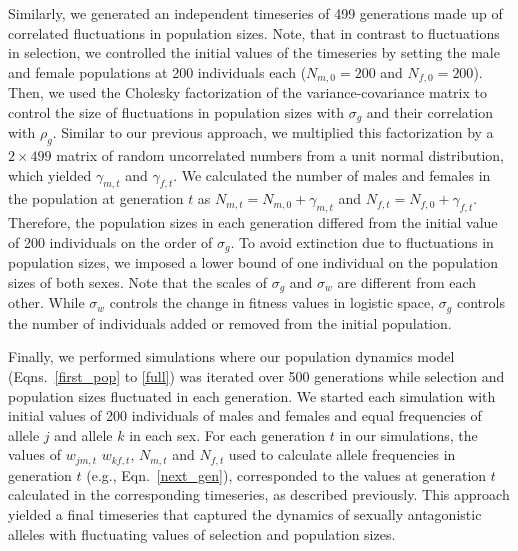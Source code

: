 \begin{refsection}
Similarly, we generated an independent timeseries of 499 generations made up of correlated fluctuations in population sizes. Note, that in contrast to fluctuations in selection, we controlled the initial values of the timeseries by setting the male and female populations at 200 individuals each ($N_{m,0} =200$ and $N_{f,0} =200$). Then, we used the Cholesky factorization of the variance-covariance matrix to control the size of fluctuations in population sizes with $\sigma_{g}$ and their correlation with $\rho_{g}$. Similar to our previous approach, we multiplied this factorization by a $2 \times 499$ matrix of random uncorrelated numbers from a unit normal distribution, which yielded $\gamma_{m,t}$ and $\gamma_{f,t}$. We calculated the number of males and females in the population at generation $t$ as $N_{m,t} = N_{m,0} + \gamma_{m,t}$ and $N_{f,t} = N_{f,0}+ \gamma_{f,t} $. Therefore, the population sizes in each generation differed from the initial value of 200 individuals on the order of $\sigma_{g}$. To avoid extinction due to fluctuations in population sizes, we imposed a lower bound of one individual on the population sizes of both sexes. Note that the scales of $\sigma_{g}$ and  $\sigma_{w}$ are different from each other. While $\sigma_{w}$ controls the change in fitness values in logistic space, $\sigma_{g}$ controls the number of individuals added or removed from the initial population.



Finally, we performed simulations where our population dynamics model (Eqns.~\ref{first_pop} to \ref{full}) was iterated over 500 generations while selection and population sizes fluctuated in each generation. We started each simulation with initial values of 200 individuals of males and females and equal frequencies of allele $j$ and allele $k$ in each sex. For each generation $t$ in our simulations, the values of $w_{jm,t}$ $w_{kf,t}$, $N_{m,t}$ and $N_{f,t}$ used to calculate allele frequencies in generation $t$ (e.g., Eqn.~\ref{next_gen}), corresponded to the values at generation $t$ calculated in the corresponding timeseries, as described previously. This approach yielded a final timeseries that captured the dynamics of sexually antagonistic alleles with fluctuating values of selection and population sizes.


\end{refsection}
